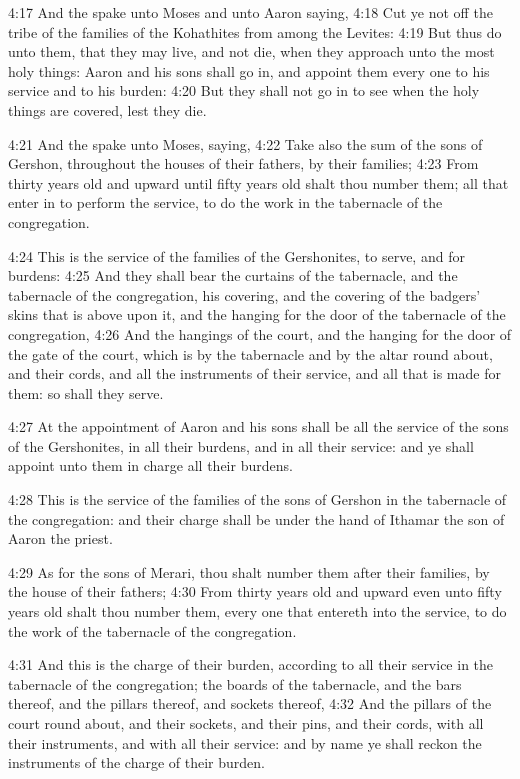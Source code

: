 4:17 And the \LORD spake unto Moses and unto Aaron saying, 4:18 Cut ye not off the tribe of the families of the Kohathites from among the Levites: 4:19 But thus do unto them, that they may live, and not die, when they approach unto the most holy things: Aaron and his sons shall go in, and appoint them every one to his service and to his burden: 4:20 But they shall not go in to see when the holy things are covered, lest they die.

4:21 And the \LORD spake unto Moses, saying, 4:22 Take also the sum of the sons of Gershon, throughout the houses of their fathers, by their families; 4:23 From thirty years old and upward until fifty years old shalt thou number them; all that enter in to perform the service, to do the work in the tabernacle of the congregation.

4:24 This is the service of the families of the Gershonites, to serve, and for burdens: 4:25 And they shall bear the curtains of the tabernacle, and the tabernacle of the congregation, his covering, and the covering of the badgers' skins that is above upon it, and the hanging for the door of the tabernacle of the congregation, 4:26 And the hangings of the court, and the hanging for the door of the gate of the court, which is by the tabernacle and by the altar round about, and their cords, and all the instruments of their service, and all that is made for them: so shall they serve.

4:27 At the appointment of Aaron and his sons shall be all the service of the sons of the Gershonites, in all their burdens, and in all their service: and ye shall appoint unto them in charge all their burdens.

4:28 This is the service of the families of the sons of Gershon in the tabernacle of the congregation: and their charge shall be under the hand of Ithamar the son of Aaron the priest.

4:29 As for the sons of Merari, thou shalt number them after their families, by the house of their fathers; 4:30 From thirty years old and upward even unto fifty years old shalt thou number them, every one that entereth into the service, to do the work of the tabernacle of the congregation.

4:31 And this is the charge of their burden, according to all their service in the tabernacle of the congregation; the boards of the tabernacle, and the bars thereof, and the pillars thereof, and sockets thereof, 4:32 And the pillars of the court round about, and their sockets, and their pins, and their cords, with all their instruments, and with all their service: and by name ye shall reckon the instruments of the charge of their burden.

